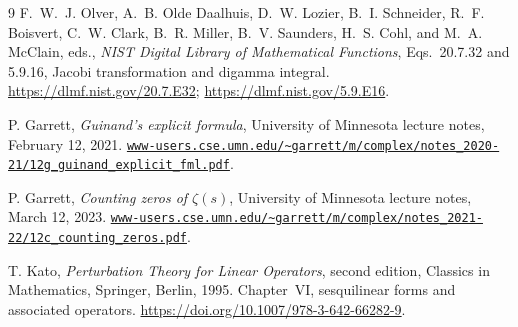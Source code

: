 \documentclass[11pt,a4paper]{article}
\numberwithin{equation}{section}
\theoremstyle{remark}
\begin{document}
\begingroup
\small
\raggedright
{}
\begin{thebibliography}{9}
\setlength{\itemsep}{3pt}
F.~W.~J. Olver, A.~B. Olde Daalhuis, D.~W. Lozier, B.~I. Schneider,
R.~F. Boisvert, C.~W. Clark, B.~R. Miller, B.~V. Saunders, H.~S. Cohl,
and M.~A. McClain, eds.,
\emph{NIST Digital Library of Mathematical Functions},
Eqs.~20.7.32 and 5.9.16, Jacobi transformation and digamma integral.
\url{https://dlmf.nist.gov/20.7.E32};
\url{https://dlmf.nist.gov/5.9.E16}.

P. Garrett, \emph{Guinand's explicit formula},
University of Minnesota lecture notes, February 12, 2021.
\newline
\href{https://www-users.cse.umn.edu/~garrett/m/complex/notes_2020-21/12g_guinand_explicit_fml.pdf}{\nolinkurl{www-users.cse.umn.edu/~garrett/m/complex/notes_2020-21/12g_guinand_explicit_fml.pdf}}.

P. Garrett, \emph{Counting zeros of $\zeta(s)$},
University of Minnesota lecture notes, March 12, 2023.
\newline
\href{https://www-users.cse.umn.edu/~garrett/m/complex/notes_2021-22/12c_counting_zeros.pdf}{\nolinkurl{www-users.cse.umn.edu/~garrett/m/complex/notes_2021-22/12c_counting_zeros.pdf}}.

T. Kato, \emph{Perturbation Theory for Linear Operators},
second edition, Classics in Mathematics, Springer, Berlin, 1995.
Chapter~VI, sesquilinear forms and associated operators.
\url{https://doi.org/10.1007/978-3-642-66282-9}.
\end{thebibliography}
\endgroup
\end{document}
